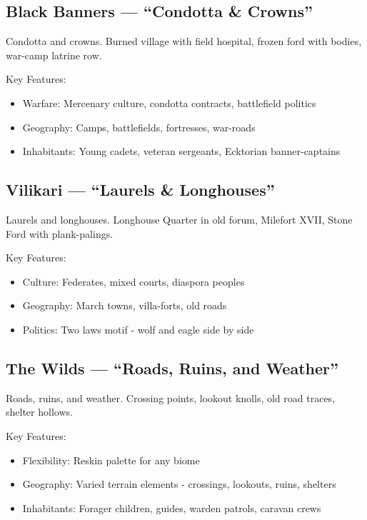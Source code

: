 \subsection{Black Banners --- ``Condotta \& Crowns''}
\label{sec:blackbanners}

Condotta and crowns. Burned village with field hospital, frozen ford with bodies, war-camp latrine row.

Key Features:
\begin{itemize}
    \item Warfare: Mercenary culture, condotta contracts, battlefield politics
    \item Geography: Camps, battlefields, fortresses, war-roads
    \item Inhabitants: Young cadets, veteran sergeants, Ecktorian banner-captains
\end{itemize}

\subsection{Vilikari --- ``Laurels \& Longhouses''}
\label{sec:vilikari}

Laurels and longhouses. Longhouse Quarter in old forum, Milefort XVII, Stone Ford with plank-palings.

Key Features:
\begin{itemize}
    \item Culture: Federates, mixed courts, diaspora peoples
    \item Geography: March towns, villa-forts, old roads
    \item Politics: Two laws motif - wolf and eagle side by side
\end{itemize}

\subsection{The Wilds --- ``Roads, Ruins, and Weather''}
\label{sec:wilds}

Roads, ruins, and weather. Crossing points, lookout knolls, old road traces, shelter hollows.

Key Features:
\begin{itemize}
    \item Flexibility: Reskin palette for any biome
    \item Geography: Varied terrain elements - crossings, lookouts, ruins, shelters
    \item Inhabitants: Forager children, guides, warden patrols, caravan crews
\end{itemize}

